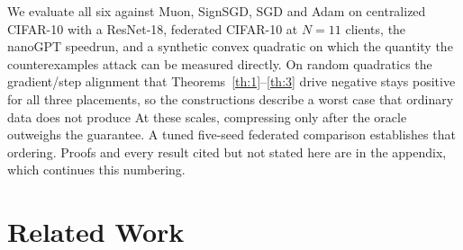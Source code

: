 We evaluate all six against Muon, SignSGD, SGD and Adam on centralized CIFAR-10 with a ResNet-18, federated CIFAR-10 at $N=11$ clients, the nanoGPT speedrun, and a synthetic convex quadratic on which the quantity the counterexamples attack can be measured directly.  On random quadratics the gradient/step alignment that Theorems~\ref{th:1}--\ref{th:3} drive negative stays positive for all three placements, so the constructions describe a worst case that ordinary data does not produce At these scales, compressing only after the oracle outweighs the guarantee. A tuned five-seed federated comparison establishes that ordering. Proofs and every result cited but not stated here are in the appendix, which continues this numbering.


\section{Related Work}\label{sec:relWork}
